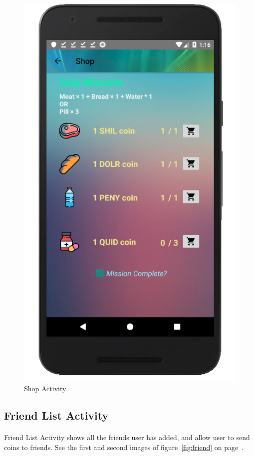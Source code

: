 \documentclass[12pt]{article}
\begin{document}
\begin{figure}
	\includegraphics[scale=0.25]{missionComplete.png}
	\caption{\label{fig:shop}Shop Activity}
\end{figure}

\subsection{Friend List Activity}
\paragraph{}
Friend List Activity shows all the friends user has added, and allow user to send coins to friends. See the first and second images of figure~\ref{fig:friend} on page~\pageref{fig:friend}.
\end{document}
